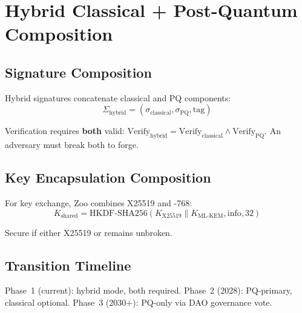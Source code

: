 \section{Hybrid Classical + Post-Quantum Composition}


\subsection{Signature Composition}

Hybrid signatures concatenate classical and PQ components:
\begin{equation}
\Sigma_{\text{hybrid}} = (\sigma_{\text{classical}}, \sigma_{\text{PQ}}, \text{tag})
\end{equation}

Verification requires \textbf{both} valid: $\text{Verify}_{\text{hybrid}} = \text{Verify}_{\text{classical}} \wedge \text{Verify}_{\text{PQ}}$. An adversary must break both to forge.

\subsection{Key Encapsulation Composition}

For key exchange, Zoo combines X25519 and \MLKEM{}-768:
\begin{equation}
K_{\text{shared}} = \text{HKDF-SHA256}(K_{\text{X25519}} \| K_{\text{ML-KEM}}, \text{info}, 32)
\end{equation}

Secure if either X25519 or \MLKEM{} remains unbroken.

\subsection{Transition Timeline}

Phase~1 (current): hybrid mode, both required. Phase~2 (2028): PQ-primary, classical optional. Phase~3 (2030+): PQ-only via DAO governance vote.

